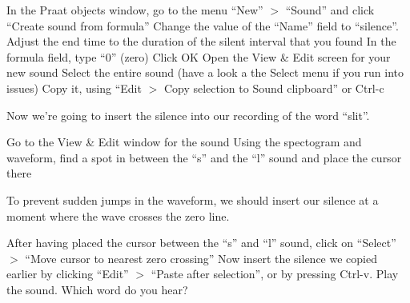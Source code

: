 \documentclass[a4paper, 9pt]{article}
\begin{document}
\begin{exercise}
\action In the Praat objects window, go to the menu ``New'' $>$ ``Sound'' and click ``Create sound from formula''
\action Change the value of the ``Name'' field to ``silence''. 
\action Adjust the end time to the duration of the silent interval that you found
\action In the formula field, type ``0'' (zero)
\action Click OK
\action Open the View \& Edit screen for your new sound
\action Select the entire sound (have a look a the Select menu if you run into issues)
\action Copy it, using ``Edit $>$ Copy selection to Sound clipboard'' or Ctrl-c
\end{exercise}

Now we're going to insert the silence into our recording of the word
``slit''.

\begin{exercise}
\action Go to the View \& Edit window for the sound 
\action Using the spectogram and waveform, find a spot in between the ``s'' and the ``l'' sound and place the cursor there
\end{exercise}

To prevent sudden jumps in the waveform, we should insert our silence at
a moment where the wave crosses the zero line.

\begin{exercise}
\action After having placed the cursor between the ``s'' and ``l'' sound, click on ``Select'' $>$ ``Move cursor to nearest zero crossing''
\action Now insert the silence we copied earlier by clicking ``Edit'' $>$ ``Paste after selection'', or by pressing Ctrl-v.
\action Play the sound. Which word do you hear?
\end{exercise}

\printbibliography
\end{document}
